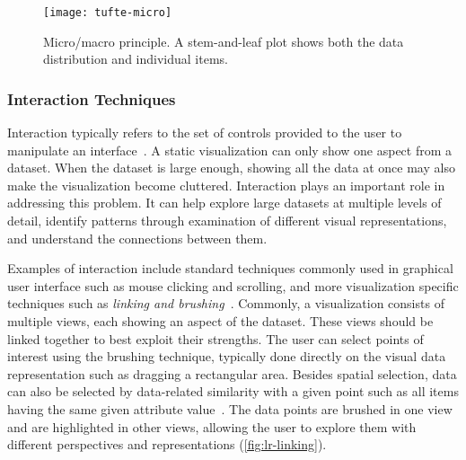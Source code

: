 \begin{figure}[!htb]
	\centering
	\texttt{[image: tufte-micro]}
	\caption[Micro/macro principle]{Micro/macro principle. A stem-and-leaf plot shows both the data distribution and individual items. }
	\label{fig:lr-tufte-micro}
\end{figure}



\subsubsection{Interaction Techniques}
Interaction typically refers to the set of controls provided to the user to manipulate an interface~\cite{Pike2009a}. A static visualization can only show one aspect from a dataset. When the dataset is large enough, showing all the data at once may also make the visualization become cluttered. Interaction plays an important role in addressing this problem. It can help explore large datasets at multiple levels of detail, identify patterns through examination of different visual representations, and understand the connections between them.

Examples of interaction include standard techniques commonly used in graphical user interface such as mouse clicking and scrolling, and more visualization specific techniques such as \emph{linking and brushing}~\cite{Kosara2003}. Commonly, a visualization consists of multiple views, each showing an aspect of the dataset. These views should be linked together to best exploit their strengths. The user can select points of interest using the brushing technique, typically done directly on the visual data representation such as dragging a rectangular area. Besides spatial selection, data can also be selected by data-related similarity with a given point such as all items having the same given attribute value~\cite{Heer2008a}. The data points are brushed in one view and are highlighted in other views, allowing the user to explore them with different perspectives and representations (\autoref{fig:lr-linking}). 


